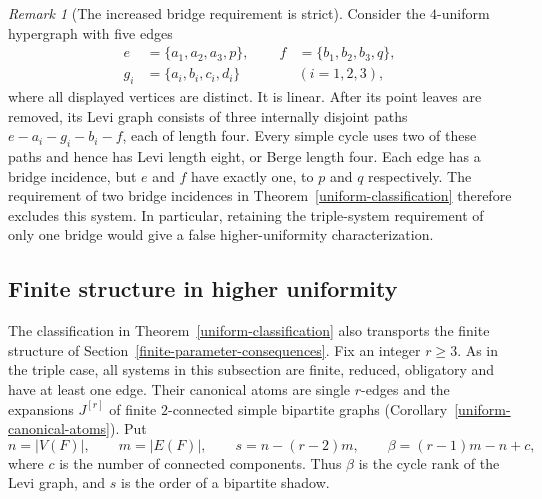 \documentclass[a4paper,11pt,reqno]{amsart}
\theoremstyle{plain}
\theoremstyle{definition}
\theoremstyle{remark}
\newtheorem{remark}[theorem]{Remark}
\begin{document}
\begin{remark}[The increased bridge requirement is strict]
\label{uniform-four-edge-example}
Consider the $4$-uniform hypergraph with five edges
\[
 \begin{aligned}
 e&=\{a_1,a_2,a_3,p\},&
 f&=\{b_1,b_2,b_3,q\},\\
 g_i&=\{a_i,b_i,c_i,d_i\}\qquad&&(i=1,2,3),
 \end{aligned}
\]
where all displayed vertices are distinct.  It is linear.  After its
point leaves are removed, its Levi graph consists of three internally
disjoint paths $e-a_i-g_i-b_i-f$, each of length four.  Every simple
cycle uses two of these paths and hence has Levi length eight, or Berge
length four.  Each edge has a bridge incidence, but $e$ and $f$ have
exactly one, to $p$ and $q$ respectively.  The requirement of two bridge
incidences in Theorem~\ref{uniform-classification} therefore excludes
this system.  In particular, retaining the triple-system requirement
of only one bridge would give a false higher-uniformity characterization.
\end{remark}

\subsection{Finite structure in higher uniformity}
\label{uniform-finite-transfer}

The classification in Theorem~\ref{uniform-classification} also transports
the finite structure of Section~\ref{finite-parameter-consequences}.
Fix an integer $r\ge3$.  As in the triple case, all systems in this
subsection are finite, reduced, obligatory and have at least one edge.
Their canonical atoms are single $r$-edges and the expansions $J^{[r]}$
of finite $2$-connected simple bipartite graphs
(Corollary~\ref{uniform-canonical-atoms}).  Put
\[
 n=|V(F)|,\qquad m=|E(F)|,\qquad
 s=n-(r-2)m,\qquad \beta=(r-1)m-n+c,
\]
where $c$ is the number of connected components.  Thus $\beta$ is the
cycle rank of the Levi graph, and $s$ is the order of a bipartite shadow.
\end{document}
